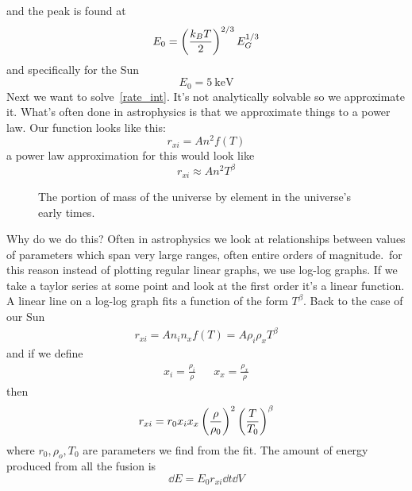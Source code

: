and the peak is found at
\begin{equation}
	E_0 = \left(\frac{k_B T}{2}\right)^{2/3}E_G^{1/3}
\end{equation}
and specifically for the Sun
\begin{equation}
	E_0 = \SI{5}{\kilo\electronvolt}
\end{equation}
Next we want to solve~\ref{rate_int}. It's not analytically solvable so we approximate it. What's often done in astrophysics is that we approximate things to a power law. Our function looks like this:
\begin{equation}
	r_{xi} = An^2f(T)
\end{equation}
a power law approximation for this would look like
\begin{equation}
	r_{xi} \approx An^2T^\beta
\end{equation}
\begin{figure}
	\caption{The portion of mass of the universe by element in the universe's early times.}
\end{figure}
Why do we do this? Often in astrophysics we look at relationships between values of parameters which span very large ranges, often entire orders of magnitude.\ for this reason instead of plotting regular linear graphs, we use log-log graphs. If we take a taylor series at some point and look at the first order it's a linear function. A linear line on a log-log graph fits a function of the form \(T^\beta \). Back to the case of our Sun
\begin{align}
	r_{xi} = An_i n_x f(T) = A\rho_i\rho_x T^\beta
\end{align}
and if we define
\begin{align}
	x_i = \frac{\rho_i}{\rho} && x_x = \frac{\rho_x}{\rho}
\end{align}
then
\begin{equation}
	r_{xi} = r_0x_i x_x\left(\frac{\rho}{\rho_0}\right)^2\left(\frac{T}{T_0}\right)^\beta
\end{equation}
where \(r_0,\rho_o,T_0\) are parameters we find from the fit. The amount of energy produced from all the fusion is
\begin{equation}
	\dd E = E_0 r_{xi}\dd t \dd V
\end{equation}
